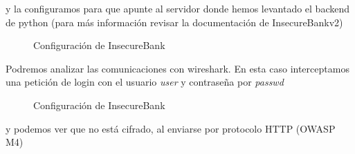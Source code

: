 \documentclass[12pt,twoside]{article}
\begin{document}
y la configuramos para que apunte al servidor donde hemos levantado el backend de python (para más información revisar la documentación de InsecureBankv2)
\begin{figure}[H]
    \centering
    \caption{Configuración de InsecureBank}
\end{figure}
Podremos analizar las comunicaciones con wireshark. En esta caso interceptamos una petición de login con el usuario \textit{user}  y contraseña por  \textit{passwd}
\begin{figure}[H]
    \centering
    \caption{Configuración de InsecureBank}
\end{figure}
y podemos ver que no está cifrado, al enviarse por protocolo HTTP (OWASP M4)
\end{document}
